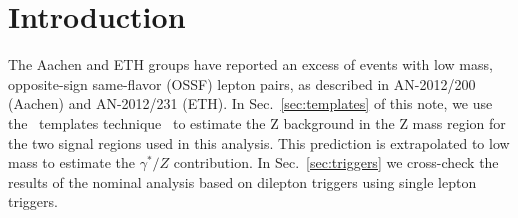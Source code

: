 \section{Introduction}
\label{ref:intro}

The Aachen and ETH groups have reported an excess of events with low mass, opposite-sign same-flavor (OSSF) lepton pairs,
as described in AN-2012/200 (Aachen) and AN-2012/231 (ETH). In Sec.~\ref{sec:templates} of this note, we use the \MET\ templates 
technique~\cite{ref:Zpaper} to estimate the Z background in the Z mass region for the two signal regions used in this analysis. 
This prediction is extrapolated to low mass to estimate the $\gamma^*/Z$ contribution. In Sec.~\ref{sec:triggers} we cross-check 
the results of the nominal analysis based on dilepton triggers using single lepton triggers.

